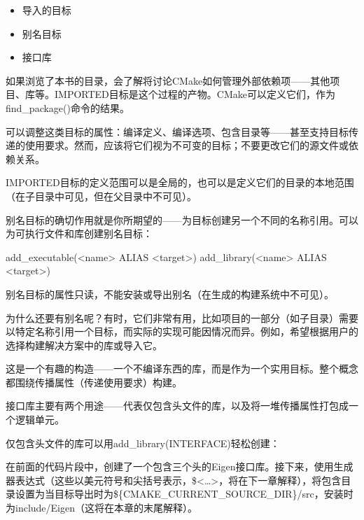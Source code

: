 \begin{itemize}
\item
导入的目标

\item
别名目标

\item
接口库
\end{itemize}


如果浏览了本书的目录，会了解将讨论CMake如何管理外部依赖项——其他项目、库等。IMPORTED目标是这个过程的产物。CMake可以定义它们，作为find\_package()命令的结果。

可以调整这类目标的属性：编译定义、编译选项、包含目录等——甚至支持目标传递的使用要求。然而，应该将它们视为不可变的目标；不要更改它们的源文件或依赖关系。

IMPORTED目标的定义范围可以是全局的，也可以是定义它们的目录的本地范围（在子目录中可见，但在父目录中不可见）。


别名目标的确切作用就是你所期望的——为目标创建另一个不同的名称引用。可以为可执行文件和库创建别名目标：

\begin{shell}
add_executable(<name> ALIAS <target>)
add_library(<name> ALIAS <target>)
\end{shell}

别名目标的属性只读，不能安装或导出别名（在生成的构建系统中不可见）。

为什么还要有别名呢？有时，它们非常有用，比如项目的一部分（如子目录）需要以特定名称引用一个目标，而实际的实现可能因情况而异。例如，希望根据用户的选择构建解决方案中的库或导入它。


这是一个有趣的构造——一个不编译东西的库，而是作为一个实用目标。整个概念都围绕传播属性（传递使用要求）构建。

接口库主要有两个用途——代表仅包含头文件的库，以及将一堆传播属性打包成一个逻辑单元。

仅包含头文件的库可以用add\_library(INTERFACE)轻松创建：


在前面的代码片段中，创建了一个包含三个头的Eigen接口库。接下来，使用生成器表达式（这些以美元符号和尖括号表示，\$<…>，将在下一章解释），将包含目录设置为当目标导出时为\$\{CMAKE\_CURRENT\_SOURCE\_DIR\}/src，安装时为include/Eigen（这将在本章的末尾解释）。

